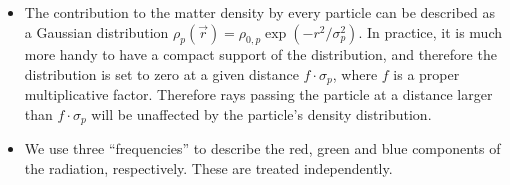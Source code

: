 \documentclass[1p,times]{elsarticle}
\begin{document}
\begin{itemize}
\item
The contribution to the matter density by every particle can
be described as a Gaussian distribution 
$\rho_p(\vec r)=\rho_{0,p}\exp(-r^2/\sigma_p^2)$.
In practice, it is much more handy to have a compact support of the
distribution, and therefore the distribution is set to zero at a given
distance $f\cdot\sigma_p$, where $f$ is a proper multiplicative factor. 
Therefore rays passing
the particle at a distance larger than $f\cdot\sigma_p$ will be
unaffected by the particle's density distribution.

\item 
We use three ``frequencies'' to describe the red, green and blue
components of the radiation, respectively. These are treated independently.


\end{itemize}
\end{document}
